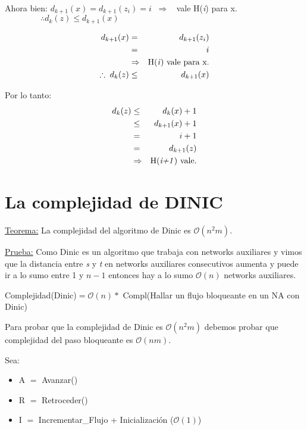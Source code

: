 \documentclass[12pt,a4paper]{report}
\begin{document}
\begin{enumerate}
			Ahora bien: \qquad $d_{k+1}(x) = d_{k+1}(z_{i}) = i \; \; \Rightarrow \; \;$ vale H(\textit{i}) para x. \\
			$ \; \qquad \qquad \therefore d_{k}(z) \leq d_{k+1}(x)$
			
			\begin{eqnarray}
					\nonumber d_{k+1}(x) & = & d_{k+1}(z_{i}) \\
					\nonumber & = & i \\
					\nonumber & \Rightarrow & \textup{H(\textit{i}) vale para x.} \\
					\nonumber \therefore \; d_{k}(z) & \leq & d_{k+1}(x)
				\end{eqnarray}
			
			Por lo tanto:
			\begin{eqnarray}
					\nonumber d_{k}(z) & \leq & d_{k}(x) + 1 \\
					\nonumber & \leq & d_{k+1}(x) + 1 \\
					\nonumber & = & i+1 \\
					\nonumber & = & d_{k+1}(z) \\
					\nonumber & \Rightarrow & \textup{H(\textit{i+1}) vale.}
				\end{eqnarray}
		\end{enumerate}


	\section{La complejidad de DINIC}

		\underline{Teorema:} La complejidad del algoritmo de Dinic es $\mathcal{O}(n^{2}m)$.
		
		\underline{Prueba:} Como Dinic es un algoritmo que trabaja con networks auxiliares y vimos que la distancia entre \textit{s} y \textit{t} en networks auxiliares consecutivos aumenta y puede ir a lo sumo entre 1 y $n-1$ entonces hay a lo sumo $\mathcal{O}(n)$ networks auxiliares.

		\begin{center}
			Complejidad(Dinic)$ = \mathcal{O}(n) *$ Compl(Hallar un flujo bloqueante en un NA con Dinic)
		\end{center}
		
		Para probar que la complejidad de Dinic es $\mathcal{O}(n^{2}m)$ debemos probar que complejidad del paso bloqueante es $\mathcal{O}(nm)$.
		
		Sea:
		\begin{itemize}
			\item A $=$ Avanzar()
			\item R $=$ Retroceder()
			\item I $=$ Incrementar\_Flujo + Inicialización ($\mathcal{O}(1)$) 
		\end{itemize}
\end{document}
